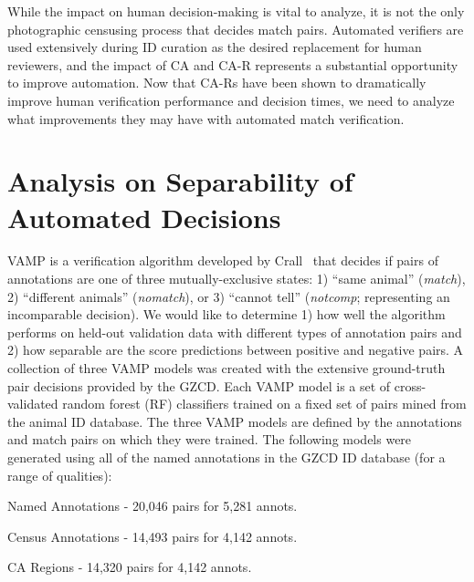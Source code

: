 While the impact on human decision-making is vital to analyze, it is not the only photographic censusing process that decides match pairs.  Automated verifiers are used extensively during ID curation as the desired replacement for human reviewers, and the impact of CA and CA-R represents a substantial opportunity to improve automation.  Now that CA-Rs have been shown to dramatically improve human verification performance and decision times, we need to analyze what improvements they may have with automated match verification.

\section{Analysis on Separability of Automated Decisions}

VAMP is a verification algorithm developed by Crall~\cite{crall_identifying_2017} that decides if pairs of annotations are one of three mutually-exclusive states: 1) ``same animal'' (\textit{match}), 2) ``different animals'' (\textit{nomatch}), or 3) ``cannot tell'' (\textit{notcomp}; representing an incomparable decision).  We would like to determine 1) how well the algorithm performs on held-out validation data with different types of annotation pairs and 2) how separable are the score predictions between positive and negative pairs.  A collection of three VAMP models was created with the extensive ground-truth pair decisions provided by the GZCD.  Each VAMP model is a set of cross-validated random forest (RF) classifiers trained on a fixed set of pairs mined from the animal ID database.  The three VAMP models are defined by the annotations and match pairs on which they were trained.  The following models were generated using all of the named annotations in the GZCD ID database (for a range of qualities):

\numsquishlist
\item Named Annotations - 20,046 pairs for 5,281 annots.
\item Census Annotations - 14,493 pairs for 4,142 annots.
\item CA Regions - 14,320 pairs for 4,142 annots.
\numsquishend

